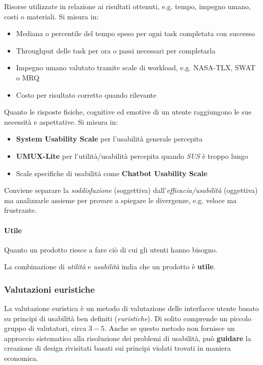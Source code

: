 \begin{definition}[Efficienza]
	Risorse utilizzate in relazione ai risultati ottenuti, e.g. tempo, impegno umano, costi o materiali. Si misura in:
	\begin{itemize}
		\item Mediana o percentile del tempo speso per ogni task completata con successo
		\item Throughput delle task per ora o passi necessari per completarla
		\item Impegno umano valutato tramite scale di workload, e.g. NASA-TLX, SWAT o MRQ
		\item Costo per risultato corretto quando rilevante
	\end{itemize}
\end{definition}

\begin{definition}[Soddisfazione]
	Quanto le risposte fisiche, cognitive ed emotive di un utente raggiungono le sue necessità e aspettative. Si misura in:
	\begin{itemize}
		\item \textbf{System Usability Scale} per l'usabilità generale percepita
		\item \textbf{UMUX-Lite} per l'utilità/usabilità percepita quando \textit{SUS} è troppo lungo
		\item Scale specifiche di usabilità come \textbf{Chatbot Usability Scale}
	\end{itemize}
\end{definition}

\begin{note}
	Conviene separare la \textit{soddisfazione} (soggettiva) dall'\textit{efficacia/usabilità} (oggettiva) ma analizzarle assieme per provare a spiegare le divergenze, e.g. veloce ma frustrante.
\end{note}

\paragraph{Utile}
\begin{definition}[Utilità]
	Quanto un prodotto riesce a fare ciò di cui gli utenti hanno bisogno.
\end{definition}
\noindent La combinazione di \textit{utilità} e \textit{usabilità} india che un prodotto è \textbf{utile}.

\subsubsection{Valutazioni euristiche}
La valutazione euristica è un metodo di valutazione delle interfacce utente basato su principi di usabilità ben definiti (\textit{euristiche}). Di solito comprende un piccolo gruppo di valutatori, circa $3-5$. Anche se questo metodo non fornisce un approccio sistematico alla risoluzione dei problemi di usabilità, può \textbf{guidare} la creazione di design rivisitati basati sui principi violati trovati in maniera economica.

